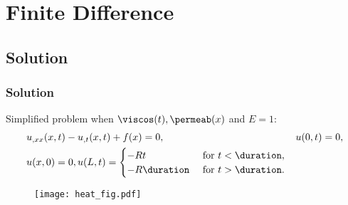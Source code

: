 \documentclass[compress]{beamer}%
\begin{document}
\section{Finite Difference}
\subsection{Solution}

\begin{frame}
  \frametitle{Solution}

  Simplified problem when ${\viscos(t)},{\permeab(x)}$ and $E=1$:
\begin{align}
  \label{eq:heat}
  &u_{,xx}(x,t) - u_{,t}(x,t) + f(x) 
  = 0,&& u(0,t) = 0, \\\nonumber
             &u(x,0) = 0, u(L,t) =
            \begin{cases}
              -Rt &\text{ for } t < \duration,\\
              -R\duration &\text{ for } t > \duration.
            \end{cases}
\end{align}

\begin{figure}
  \centering
  \texttt{[image: heat\_fig.pdf]}
  \label{fig:findiff-heat}
\end{figure}

\end{frame}
\end{document}
